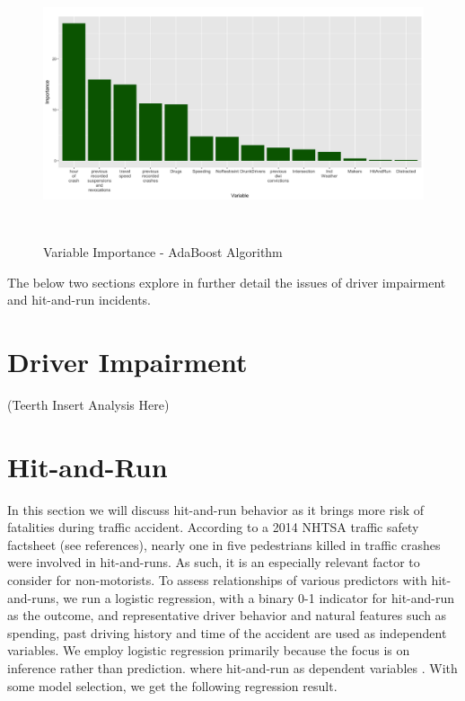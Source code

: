\documentclass[11pt, oneside,titlepage]{article}   	%
\begin{document}
\begin{figure}[H]
\centering
  \includegraphics[width=15cm,height=8cm,keepaspectratio]{ImportancePlot_ADABoost.png}
\caption{Variable Importance - AdaBoost Algorithm}
\end{figure}

The below two sections explore in further detail the issues of driver impairment and hit-and-run incidents.

\section*{Driver Impairment}

(Teerth Insert Analysis Here)

\section*{Hit-and-Run}
In this section we will discuss hit-and-run behavior as it brings more risk of fatalities during traffic accident. According to a 2014 NHTSA traffic safety factsheet (see references), nearly one in five pedestrians killed in traffic crashes were involved in hit-and-runs. As such, it is an especially relevant factor to consider for non-motorists. To assess relationships of various predictors with hit-and-runs, we run a logistic regression, with a binary 0-1 indicator for hit-and-run as the outcome, and representative driver behavior and natural features such as spending, past driving history and time of the accident are used as independent variables. We employ logistic regression primarily because the focus is on inference rather than prediction. where hit-and-run as dependent variables . With some model selection, we get the following regression result.
\end{document}

